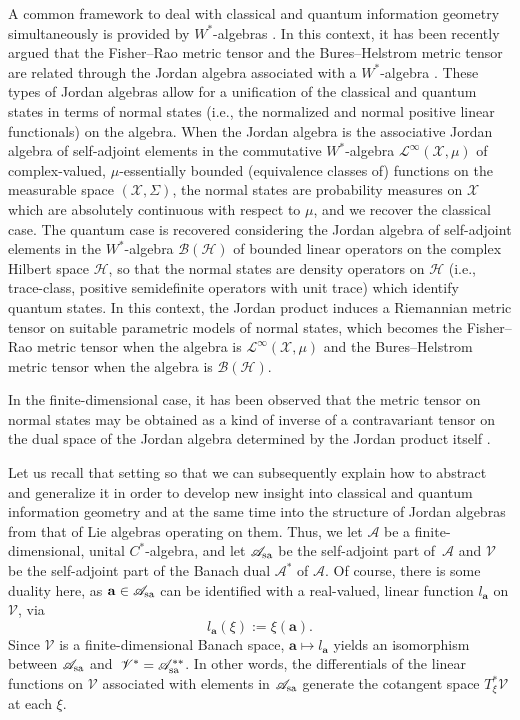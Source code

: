 \documentclass[pdftex]{sigma}
\numberwithin{equation}{section}
\newcommand{\appa}{\mathscr{A}}
\newcommand{\appas}{\mathscr{A}_{\rm sa}}
\newcommand{\stav}{\mathscr{V}}
\begin{document}
A common framework to deal with classical and quantum information geometry simultaneously is provided by $W^*$-algebras \cite{C-J-S-2020-02,C-J-S-2020,C-DN-J-S-2023,Jencova-2003,Jencova-2006,Kostecki-2011}.
In this context, it has been recently argued that the Fisher--Rao metric tensor and the Bures--Helstrom metric tensor are related through the Jordan algebra associated with a $W^{*}$-algebra \cite{C-J-S-2020-02,C-J-S-2020, C-DN-J-S-2023}.
These types of Jordan algebras allow for a unification of the classical and quantum states in terms of normal states (i.e., the normalized and normal positive linear functionals) on the algebra.
When the Jordan algebra is the associative Jordan algebra of self-adjoint elements in the commutative $W^{*}$-algebra $\mathcal{L}^{\infty}(\mathcal{X},\mu)$ of complex-valued, $\mu$-essentially bounded (equivalence classes of) functions on the measurable space $(\mathcal{X},\Sigma)$, the normal states are probability measures on $\mathcal{X}$ which are absolutely continuous with respect to $\mu$, and we recover the classical case.
The quantum case is recovered considering the Jordan algebra of self-adjoint elements in the $W^{*}$-algebra $\mathcal{B}(\mathcal{H})$ of bounded linear operators on the complex Hilbert space $\mathcal{H}$, so that the normal states are density operators on $\mathcal{H}$ (i.e., trace-class, positive semidefinite operators with unit trace) which identify quantum states.
In this context, the Jordan product induces a Riemannian metric tensor on suitable parametric models of normal states, which becomes the Fisher--Rao metric tensor when the algebra is $\mathcal{L}^{\infty}(\mathcal{X},\mu)$ and the Bures--Helstrom metric tensor when the algebra is $\mathcal{B}(\mathcal{H})$.


In the finite-dimensional case, it has been observed that the metric tensor on normal states may be obtained as a kind of inverse of a contravariant tensor on the dual space of the Jordan algebra determined by the Jordan product itself \cite{C-J-S-2020}.

Let us recall that setting so that we can subsequently explain how to abstract and generalize it in order to develop new insight into classical and quantum information geometry and at the same time into the structure of Jordan algebras from that of Lie algebras operating on them.
Thus, we let $\appa$ be a finite-dimensional, unital $C^{*}$-algebra, and let $\appas$ be the self-adjoint part of~$\appa$ and $\stav$ be the self-adjoint part of the Banach dual $\appa^{*}$ of $\appa$.
 Of course, there is some duality here, as $\mathbf{a}\in\appas$ can be identified with a real-valued, linear function $l_{\mathbf{a}}$ on $\stav$, via
\[
l_{\mathbf{a}}(\xi) := \xi(\mathbf{a}).
\]
Since $\stav$ is a finite-dimensional Banach space, $\mathbf{a}\mapsto l_{\mathbf{a}}$ yields an isomorphism between $\appas$ and~$\stav^{*}=\appas^{**}$. In other words, the differentials of the linear functions on $\stav$ associated with elements in $\appas$ generate the cotangent space $T_{\xi}^{*}\stav$ at each $\xi$.
\end{document}
